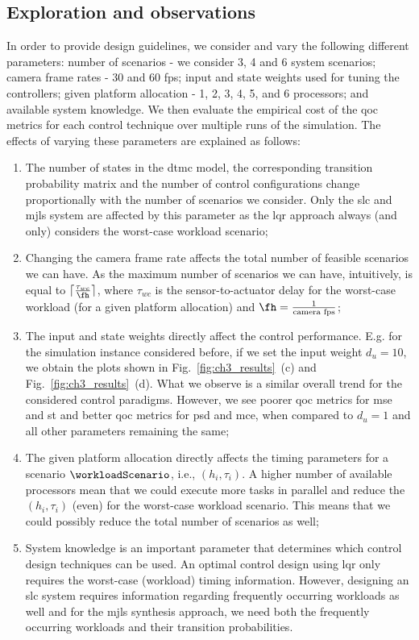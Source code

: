 \subsection{Exploration and observations}
\label{sec:ch3_observations}
In order to provide design guidelines, we consider and vary the following different parameters: number of scenarios - we consider 3, 4 and 6 system scenarios; camera frame rates - 30 and 60 fps; input and state weights used for tuning the controllers; given platform allocation - 1, 2, 3, 4, 5, and 6 processors; and available system knowledge. We then evaluate the empirical cost of the \gls{qoc} metrics for each control technique over multiple runs of the simulation. The effects of varying these parameters are explained as follows:
\begin{enumerate}
    \item The number of states in the \gls{dtmc} model, the corresponding transition probability matrix and the number of control configurations change proportionally with the number of scenarios we consider. Only the \gls{slc} and \gls{mjls} system are affected by this parameter as the \gls{lqr} approach always (and only) considers the worst-case workload scenario;
    \item Changing the camera frame rate affects the total number of feasible scenarios we can have. As the maximum number of scenarios we can have, intuitively, is equal to $\lceil \frac{\tau_{wc}}{\fh}\rceil$, where $\tau_{wc}$ is the sensor-to-actuator delay for the worst-case workload (for a given platform allocation) and $\fh=\frac{1}{\text{camera fps}}$; 
    \item The input and state weights directly affect the control performance. E.g. for the simulation instance considered before, if we set the input weight $d_u=10$, we obtain the plots shown in Fig.~\ref{fig:ch3_results}~(c) and Fig.~\ref{fig:ch3_results}~(d). What we observe is a similar overall trend for the considered control paradigms. However, we see poorer \gls{qoc} metrics for \gls{mse} and \gls{st} and better \gls{qoc} metrics for \gls{psd} and \gls{mce}, when compared to $d_u=1$ and all other parameters remaining the same;
    \item The given platform allocation directly affects the timing parameters for a scenario $\workloadScenario$, i.e., $(h_i,\tau_i)$. A higher number of available processors mean that we could execute more tasks in parallel and reduce the  $(h_i,\tau_i)$ (even) for the worst-case workload scenario. This means that we could possibly reduce the total number of scenarios as well;
    \item System knowledge is an important parameter that determines which control design techniques can be used. An optimal control design using \gls{lqr} only requires the worst-case (workload) timing information. However,  designing an \gls{slc} system requires information regarding frequently occurring workloads as well and for the \gls{mjls} synthesis approach, we need both the frequently occurring workloads and their transition probabilities.
\end{enumerate}

